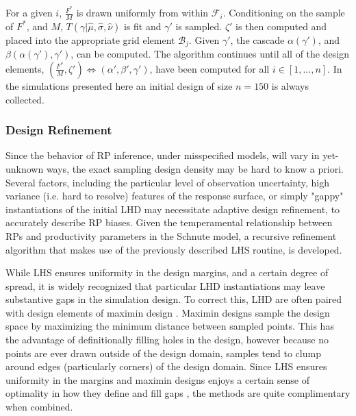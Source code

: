 %
For a given $i$, $\frac{F^*}{M}$ is drawn uniformly from within $\mathcal{F}_i$. Conditioning on the
sample of $F^*$, and $M$, $T(\gamma|\hat\mu, \hat\sigma, \hat\nu)$ is fit and
$\gamma'$ is sampled. $\zeta'$ is then computed and placed into the appropriate
grid element $\mathcal{B}_j$. Given $\gamma'$, the cascade $\alpha(\gamma')$,
and $\beta(\alpha(\gamma'), \gamma')$, can be computed. The algorithm
continues until all of the design elements, \mbox{$(\frac{F^*}{M}, \zeta')\Leftrightarrow(\alpha', \beta', \gamma')$,}
have been computed for all $i\in[1,...,n]$. In the simulations presented here 
an initial design of size $n=150$ is always collected. 

%
\subsubsection{Design Refinement\label{desRef}}

%
Since the behavior of RP inference, under misspecified models, will vary in
yet-unknown ways, the exact sampling design density may be hard to know a priori.
Several factors, including the particular level of observation uncertainty,
high variance (i.e. hard to resolve) features of the response surface, or
simply "gappy" instantiations of the initial LHD may necessitate
adaptive design refinement, to accurately describe RP biases. Given the
temperamental relationship between RPs and productivity parameters in the
Schnute model, a recursive refinement algorithm that makes use of the
previously described LHS routine, is developed.

%
While LHS ensures uniformity in the design margins, and a certain degree of spread,
it is widely recognized that particular LHD instantiations may leave substantive gaps
in the simulation design. To correct this, LHD are often paired with design elements
of maximin design \cite{morris_exploratory_1995,devon_lin_latin_2015}. Maximin designs sample
the design space by maximizing the minimum distance between sampled points.
This has the advantage of definitionally filling holes in the design, %
however because no points are ever drawn outside of the design domain, samples tend to
clump around edges (particularly corners) of the design domain. Since LHS ensures
uniformity in the margins and maximin designs enjoys a certain sense of optimality 
in how they define and fill gaps \cite{johnson_minimax_1990}, the methods are 
quite complimentary when combined.

